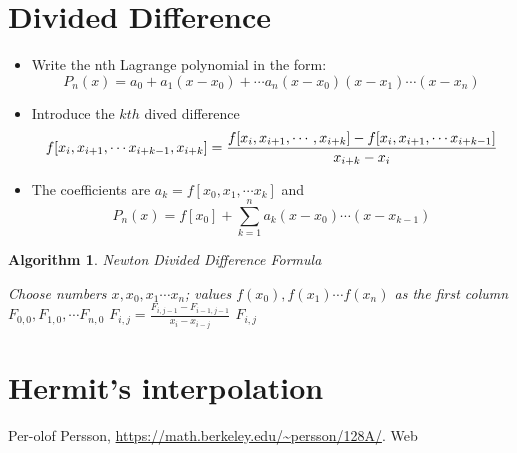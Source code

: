 \documentclass[12pt]{article}
\newtheorem{alg}[theorem]{Algorithm}
\begin{document}
\section{Divided Difference}
\begin{itemize}
	\item Write the nth Lagrange polynomial in the form: 
	$$P_n(x) = a_0 +a_1(x - x_0) +\cdots a_n(x - x_0)(x - x_1) \cdots (x-x_n)$$
	\item Introduce the $kth$ dived difference
	$$
		f[x_i, x_{i+1}, \cdots x_{i+k-1}, x_{i+k}]  =  \\
		\frac{f[x_i, x_{i+1}, \cdots, x_{i+k}] - f[x_i, x_{i+1}, \cdots x_{i+k-1}]}{x_{i+k} - x_i}
	$$
	\item The coefficients are $a_k = f[x_0,x_1, \cdots x_k]$ and 
	$$P_n(x) = f[x_0] + \sum_{k=1}^{n}a_k(x - x_0) \cdots (x - x_{k-1})$$
\end{itemize}
\begin{alg}{Newton Divided Difference Formula}
\begin{algorithmic}
Choose numbers $x,x_0,x_1 \cdots x_n$; values $f(x_0), f(x_1) \cdots f(x_n)$ as the first column $F_{0,0}, F_{1,0}, \cdots F_{n,0}$ 
\State $F_{i,j} = \frac{F_{i,j-1} -F_{i-1,j-1}}{x_i - x_{i-j}}$
\EndFor
\EndFor
\State \Return $F_{i,j}$
\end{algorithmic}


\end{alg}

\section{Hermit's interpolation}







 \newpage
 \begin{thebibliography}{1}

      Per-olof Persson, \url{https://math.berkeley.edu/~persson/128A/}. Web

  \end{thebibliography}
\end{document}
